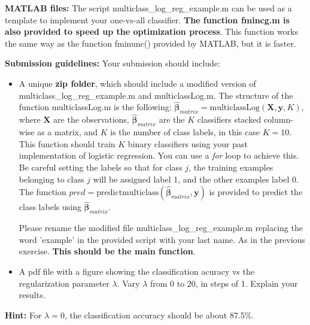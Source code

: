 \documentclass[11pt,oneside,a4paper]{article}
\begin{document}
\begin{enumerate}
  \textbf{MATLAB files:} The script multiclass\_log\_reg\_example.m can be used as a template to implement your one-vs-all classifier. \textbf{The function fmincg.m is also provided to speed up the optimization process}. This function works the same way as the function fminunc() provided by MATLAB, but it is faster.

  \textbf{Submission guidelines:} Your submission should include:
  \begin{itemize}
  	\item A unique \textbf{zip folder}, which should include a modified version of multiclass\_log\_reg\_example.m and multiclassLog.m. The structure of the function multiclassLog.m is the following: $\hat{\pmb{\beta}}_{matrix}=\text{multiclassLog}(\textbf{X},\textbf{y},K)$, where $\textbf{X}$ are the observations, $\hat{\pmb{\beta}}_{matrix}$ are the $K$ classifiers stacked column-wise as a matrix, and $K$ is the number of class labels, in this case $K=10$. This function should train $K$ binary classifiers using your past implementation of logistic regression. You can use a \textit{for} loop to achieve this. Be careful setting the labels so that for class $j$, the training examples belonging to class $j$ will be assigned label 1, and the other examples label 0. The function $pred=\text{predictmulticlass}(\hat{\pmb{\beta}}_{matrix},\textbf{y})$ is provided to predict the class labels using $\hat{\pmb{\beta}}_{matrix}$.
  	
  	Please rename the modified file multiclass\_log\_reg\_example.m replacing the word 'example' in the provided script with your last name. As in the previous exercise. \textbf{This should be the main function}.
  	
  	\item A pdf file with a figure showing the classification acuracy vs the regularization parameter $\lambda$. Vary $\lambda$ from 0 to 20, in steps of 1. Explain your results.
  \end{itemize}
  \textbf{Hint:} For $\lambda=0$, the classification accuracy should be about 87.5\%. 
\end{enumerate}
%
%
\end{document}
